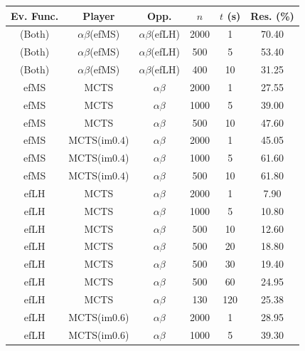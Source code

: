 \documentclass{article}
\begin{document}
\begin{table}[t!]
{\small
\begin{center}
\begin{tabular}{ccccc|c}
Ev. Func.  & Player              & Opp.                 & $n$    & $t$ (s) & Res. (\%) \\
\hline
(Both)     & $\alpha\beta$(efMS) & $\alpha\beta$(efLH)  & 2000   & 1       & 70.40     \\
(Both)     & $\alpha\beta$(efMS) & $\alpha\beta$(efLH)  &  500   & 5       & 53.40     \\
(Both)     & $\alpha\beta$(efMS) & $\alpha\beta$(efLH)  &  400   & 10      & 31.25     \\
\hline
\hline
efMS       & MCTS              & $\alpha\beta$    & 2000   & 1       & 27.55     \\     
efMS       & MCTS              & $\alpha\beta$    & 1000   & 5       & 39.00     \\     
efMS       & MCTS              & $\alpha\beta$    &  500   & 10      & 47.60     \\     
\hline
efMS       & MCTS(im$0.4$)     & $\alpha\beta$    & 2000   & 1       & 45.05     \\     
efMS       & MCTS(im$0.4$)     & $\alpha\beta$    & 1000   & 5       & 61.60     \\     
efMS       & MCTS(im$0.4$)     & $\alpha\beta$    &  500   & 10      & 61.80     \\     
\hline
\hline
efLH       & MCTS              & $\alpha\beta$    & 2000   & 1       &  7.90      \\     
efLH       & MCTS              & $\alpha\beta$    & 1000   & 5       & 10.80      \\     
efLH       & MCTS              & $\alpha\beta$    &  500   & 10      & 12.60      \\     
efLH       & MCTS              & $\alpha\beta$    &  500   & 20      & 18.80      \\     
efLH       & MCTS              & $\alpha\beta$    &  500   & 30      & 19.40      \\     
efLH       & MCTS              & $\alpha\beta$    &  500   & 60      & 24.95      \\     
efLH       & MCTS              & $\alpha\beta$    &  130   & 120     & 25.38      \\     
\hline
efLH       & MCTS(im$0.6$)     & $\alpha\beta$    & 2000   & 1       & 28.95      \\     
efLH       & MCTS(im$0.6$)     & $\alpha\beta$    & 1000   & 5       & 39.30      \\     

\end{tabular}
\end{center}}
\end{table}
\end{document}

